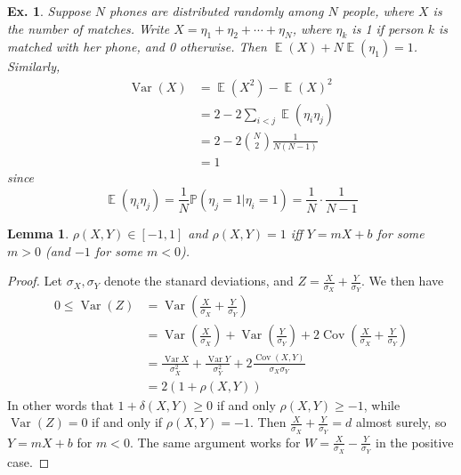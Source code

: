 \documentclass[12pt, a4paper]{book}
\DeclareMathOperator{\E}{\mathbb{E}}
\DeclareMathOperator{\Var}{Var}
\DeclareMathOperator{\Cov}{Cov}
\renewcommand{\Pr}{\mathbb{P}}
\newtheorem{lemma}[theorem]{Lemma}
\newtheorem{example}[theorem]{Ex.}
\theoremstyle{nonumberplain}
\newtheorem{proof}{Proof}
\begin{document}
\begin{example}
    Suppose $N$ phones are distributed randomly among $N$ people, where $X$ is the number of matches.
    Write $X=\eta_1+\eta_2+\cdots+\eta_N$, where $\eta_k$ is 1 if person $k$ is matched with her phone, and 0 otherwise.
    Then $\E(X)+N\E(\eta_1)=1$.
    Similarly,
    \begin{align*}
        \Var(X)&=\E(X^2)-\E(X)^2\\
               &= 2-2\sum\limits_{i<j}\E(\eta_i\eta_j)\\
               &= 2-2\binom{N}{2}\frac{1}{N(N-1)}\\
               &= 1
    \end{align*}
    since
    \[\E(\eta_i\eta_j)=\frac{1}{N}\Pr(\eta_j=1|\eta_i=1)=\frac{1}{N}\cdot\frac{1}{N-1}\]
\end{example}
\begin{lemma}
    $\rho(X,Y)\in[-1,1]$ and $\rho(X,Y)=1$ iff $Y=mX+b$ for some $m>0$ (and $-1$ for some $m<0$).
\end{lemma}
\begin{proof}
    Let $\sigma_X,\sigma_Y$ denote the stanard deviations, and $Z=\frac{X}{\sigma_X}+\frac{Y}{\sigma_Y}$.
    We then have
    \begin{align*}
        0\leq\Var(Z) &= \Var\left(\frac{X}{\sigma_X}+\frac{Y}{\sigma_Y}\right)\\
                     &= \Var\left(\frac{X}{\sigma_X}\right)+\Var\left(\frac{Y}{\sigma_Y}\right)+2\Cov\left(\frac{X}{\sigma_X}+\frac{Y}{\sigma_Y}\right)\\
                     &= \frac{\Var X}{\sigma_X^2}+\frac{\Var Y}{\sigma_Y^2}+2\frac{\Cov(X,Y)}{\sigma_X\sigma_Y}\\
                     &= 2(1+\rho(X,Y))
    \end{align*}
    In other words that $1+\delta(X,Y)\geq 0$ if and only $\rho(X,Y)\geq -1$, while $\Var(Z)=0$ if and only if $\rho(X,Y)=-1$.
    Then $\frac{X}{\sigma_X}+\frac{Y}{\sigma_Y}=d$ almost surely, so $Y=mX+b$ for $m<0$.
    The same argument works for $W=\frac{X}{\sigma_X}-\frac{Y}{\sigma_Y}$ in the positive case.
\end{proof}
\end{document}
